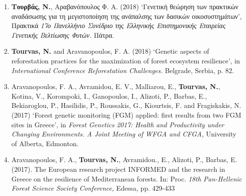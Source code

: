 \documentclass[12pt,]{scrartcl}
\begin{document}
\begin{enumerate}
\item {\textbf{Τουρβάς, Ν.}, Αραβανόπουλος Φ. Α. (2018) ‘Γενετική θεώρηση των πρακτικών αναδάσωσης για τη μεγιστοποίηση της ανάπαλσης των δασικών οικοσυστημάτων’, Πρακτικά \textit{17ο Πανελλήνιο Συνέδριο της Ελληνικής Επιστημονικής Εταιρείας Γενετικής Βελτίωσης Φυτών.} Πάτρα.}

\leftskip-0.07in  
\item {\textbf{Tourvas, N.} and Aravanopoulos, F. A. (2018) ‘Genetic aspects of reforestation practices for the maximization of forest ecosystem resilience’, in \textit{International Conference Reforestation Challenges.} Belgrade, Serbia, p. 82.}

\leftskip-0.07in  


\leftskip-0.07in  
\item {Aravanopoulos, F. A., Avramidou, E. V., Malliarou, E., \textbf{Tourvas, N.}, Kotina, V., Korompoki, I., Ganopoulos, I., Alizoti, P., Barbas, E., Bekiaroglou, P., Hasilidis, P., Roussakis, G., Kiourtsis, F. and Fragiskakis, N. (2017) ‘Forest genetic monitoring (FGM) applied: first results from two FGM sites in Greece’, in \textit{Forest Genetics 2017: Health and Productivity under Changing Environments. A Joint Meeting of WFGA and CFGA,} University of Alberta, Edmonton.}

\leftskip-0.07in  
\item {Aravanopoulos, F. Α., \textbf{Tourvas, N.}, Avramidou., E., Alizoti, P., Barbas, E. (2017). The European research project INFORMED and the research in Greece on the resilience of Mediterranean forests. In: Proc. \textit{18th Pan-Hellenic Forest Science Society Conference,} Edessa, pp. 429-433}
 

\end{enumerate}
\end{document}
